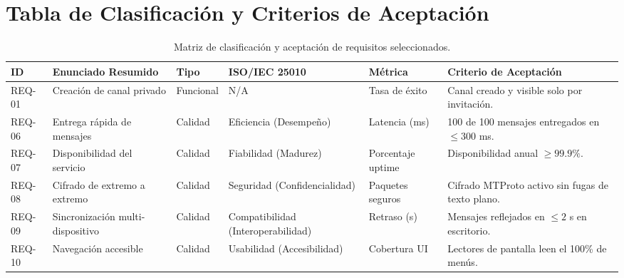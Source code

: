 \documentclass[11pt,a4paper]{article}
\begin{document}
\section{Tabla de Clasificación y Criterios de Aceptación}
\begin{table}[h]
\centering
\scriptsize
\setlength{\tabcolsep}{3pt}
\begin{tabularx}{\textwidth}{l X l l X X}
\toprule
\textbf{ID} & \textbf{Enunciado Resumido} & \textbf{Tipo} & \textbf{ISO/IEC 25010} & \textbf{Métrica} & \textbf{Criterio de Aceptación} \\
\midrule
REQ-01 & Creación de canal privado & Funcional & N/A & Tasa de éxito & Canal creado y visible solo por invitación. \\
REQ-06 & Entrega rápida de mensajes & Calidad & Eficiencia (Desempeño) & Latencia (ms) & 100 de 100 mensajes entregados en $\le 300$ ms. \\
REQ-07 & Disponibilidad del servicio & Calidad & Fiabilidad (Madurez) & Porcentaje uptime & Disponibilidad anual $\ge 99.9\%$. \\
REQ-08 & Cifrado de extremo a extremo & Calidad & Seguridad (Confidencialidad) & Paquetes seguros & Cifrado MTProto activo sin fugas de texto plano. \\
REQ-09 & Sincronización multi-dispositivo & Calidad & Compatibilidad (Interoperabilidad) & Retraso (s) & Mensajes reflejados en $\le 2$ s en escritorio. \\
REQ-10 & Navegación accesible & Calidad & Usabilidad (Accesibilidad) & Cobertura UI & Lectores de pantalla leen el 100\% de menús. \\
\bottomrule
\end{tabularx}%
\caption{Matriz de clasificación y aceptación de requisitos seleccionados.}
\label{tab:clasificacion}
\end{table}

\end{document}
